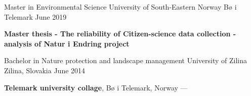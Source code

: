 
\begin{cventries}
  \cventry
    {Master in Environmental Science} %
    {University of South-Eastern Norway} %
    {Bø i Telemark} %
    {June 2019} %
    {
      \begin{cvitems}
        \item  {\textbf{Master thesis - The reliability of Citizen-science data collection - analysis of Natur i Endring project}}
      \end{cvitems}
    }
    
  \vspace{0.5mm}
  \cventry
    {Bachelor in Nature protection and landscape management} %
    {University of Zilina} %
    {Zilina, Slovakia} %
    {June 2014} %
    {
      \begin{cvitems} %
         \item {\textbf{Telemark university collage}, Bø i Telemark, Norway --- }
      \end{cvitems}
    }
    
\end{cventries}
